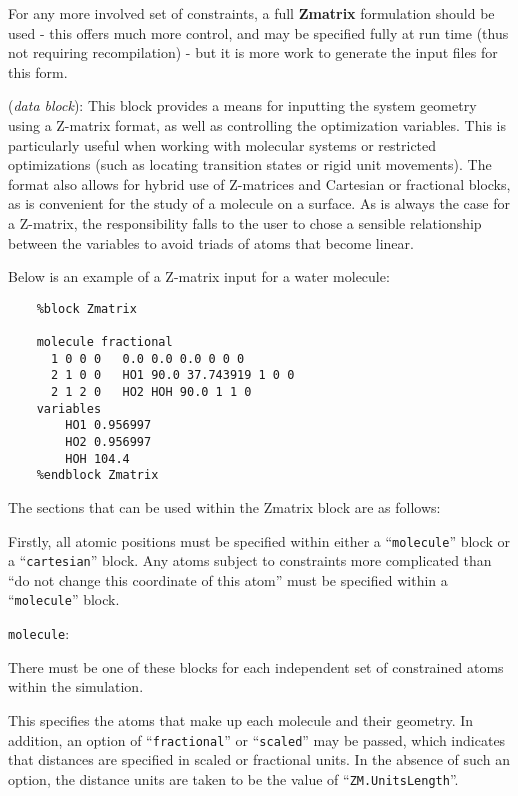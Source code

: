 \documentclass[11pt]{article}
\begin{document}
For any more involved set of constraints, a
full \textbf{Zmatrix} formulation should be used - this
offers much more control, and may be specified fully at
run time (thus not requiring recompilation) - but
it is more work to generate the input files for this form.


\begin{description}
\itemsep 10pt
\parsep 0pt

\item[{\bf Zmatrix}] ({\it data block}): 
  This block provides a means for inputting the system geometry using
  a Z-matrix format, as well as controlling the optimization
  variables. This is particularly useful when working with molecular
  systems or restricted optimizations (such as locating transition
  states or rigid unit movements). The format also allows for hybrid
  use of Z-matrices and Cartesian or fractional blocks, as is
  convenient for the study of a molecule on a surface.  As is always
  the case for a Z-matrix, the responsibility falls to the user to
  chose a sensible relationship between the variables to avoid triads
  of atoms that become linear.

Below is an example of a Z-matrix input for a water molecule:
\begin{verbatim}
    %block Zmatrix

    molecule fractional
      1 0 0 0   0.0 0.0 0.0 0 0 0
      2 1 0 0   HO1 90.0 37.743919 1 0 0
      2 1 2 0   HO2 HOH 90.0 1 1 0
    variables
        HO1 0.956997
        HO2 0.956997
        HOH 104.4
    %endblock Zmatrix
\end{verbatim}

The sections that can be used within the Zmatrix block are as follows:

Firstly, all atomic positions must be specified within either a
``\texttt{molecule}'' block or a ``\texttt{cartesian}'' block.  Any
atoms subject to constraints more complicated than ``do not change
this coordinate of this atom'' must be specified within a
``\texttt{molecule}'' block.

\item \texttt{molecule}:

There must be one of these blocks for each independent set of
constrained atoms within the simulation.

This specifies the atoms that make up each molecule and their
geometry. In addition, an option of ``\texttt{fractional}'' or
``\texttt{scaled}'' may be passed, which indicates that distances are
specified in scaled or fractional units. In the absence of such an
option, the distance units are taken to be the value of
``\texttt{ZM.UnitsLength}''.


\end{description}
\end{document}
